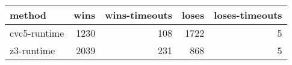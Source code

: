 \begin{tabular}{lrrrr}
\hline
 method       &   wins &   wins-timeouts &   loses &   loses-timeouts \\
\hline
 cvc5-runtime &   1230 &             108 &    1722 &                5 \\
 z3-runtime   &   2039 &             231 &     868 &                5 \\
\hline
\end{tabular}
